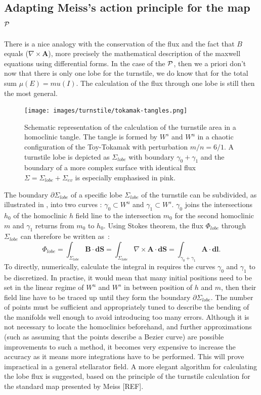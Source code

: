 \subsection{Adapting Meiss's action principle for the map $\mathcal{P}$}
\newcommand{\Sl}{\Sigma_{lobe}}
\newcommand{\Se}{\Sigma_{ev}}

There is a nice analogy with the conservation of the flux and the fact that $B$ equals ($\nabla\times\textbf{A}$), more precisely the mathematical description of the maxwell equations using differential forms. In the case of the $\mathcal{P}$, then we a priori don't now that there is only one lobe for the turnstile, we do know that for the total sum $\mu(E) = mu(I)$. The calculation of the flux through one lobe is still then the most general.

\begin{figure}[H]
    \centering
    \texttt{[image: images/turnstile/tokamak-tangles.png]}
    \caption{Schematic representation of the calculation of the turnstile area in a homoclinic tangle. The tangle is formed by $W^s$ and $W^u$ in a chaotic configuration of the Toy-Tokamak with perturbation $m/n = 6/1$. A turnstile lobe is depicted as $\Sl$ with boundary $\gamma_0 + \gamma_1$ and the boundary of a more complex surface with identical flux $\Sigma = \Sl + \Se$ is especially emphasised in pink.}
    \label{fig:tangle-3d}
\end{figure}

The boundary $\partial\Sl$ of a specific lobe $\Sl$ of the turnstile can be subdivided, as illustrated in , into two curves : $\gamma_0\subset W^u$ and $\gamma_1\subset W^s$. $\gamma_0$ joins the intersections $h_0$ of the homoclinic $h$ field line to the intersection $m_0$ for the second homoclinic $m$ and $\gamma_1$ returns from $m_0$ to $h_0$. Using Stokes theorem, the flux  $\Phi_{lobe}$  through $\Sl$ can therefore be written as~:
\begin{equation}\label{eq:contour-1}
    \Phi_{lobe} = \int_{\Sl} \textbf{B}\cdot\textbf{dS} = \int_{\Sl} \nabla\times\textbf{A}\cdot\textbf{dS} = \int_{\gamma_0+\gamma_1} \textbf{A}\cdot \textbf{dl}.
\end{equation}
To directly, numerically, calculate the integral in  requires the curves $\gamma_0$ and $\gamma_1$ to be discretized. In practise, it would mean that many initial positions need to be set in the linear regime of $W^u$ and $W^s$ in between position of $h$ and $m$, then their field line have to be traced up until they form the boundary $\partial\Sl$. The number of points must be sufficient and appropriately tuned to describe the bending of the manifolds well enough to avoid introducing too many errors. Although it is not necessary to locate the homoclinics beforehand, and further approximations (such as assuming that the points describe a Bezier curve) are possible improvements to such a method, it becomes very expensive to increase the accuracy as it means more integrations have to be performed. This will prove impractical in a general stellarator field. A more elegant algorithm for calculating the lobe flux is suggested, based on the principle of the turnstile calculation for the standard map presented by Meiss [REF].

